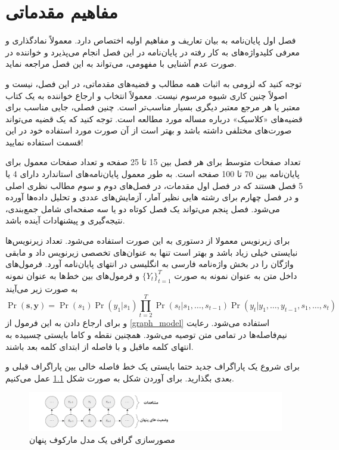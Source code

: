 \chapter{
مفاهیم مقدماتی
}\label{S1}
\setcounter{page}{1}

فصل اول پایان‌نامه به بیان تعاریف و مفاهیم اولیه اختصاص دارد.  معمولاً نمادگذاری و معرفی کلیدواژه‌های به کار رفته در پایان‌نامه در این فصل انجام می‌پذیرد و خواننده در صورت عدم آشنایی با مفهومی، می‌تواند به این فصل مراجعه نماید.

 توجه کنید که لزومی به اثبات همه مطالب و قضیه‌های مقدماتی، در این فصل، نیست و اصولاً چنین کاری شیوه مرسوم نیست. معمولاً انتخاب و ارجاع خواننده به یک کتاب معتبر یا هر مرجع معتبر دیگری بسیار مناسب‌تر است. چنین فصلی، جایی مناسب برای قضیه‌های «کلاسیک» درباره مساله مورد مطالعه است. توجه کنید که یک قضیه می‌تواند صورت‌های مختلفی داشته باشد و بهتر است از آن صورت مورد استفاده خود در این قسمت استفاده نمایید!

تعداد صفحات متوسط برای هر فصل بین 15 تا 25 صفحه و تعداد صفحات معمول برای پایان‌نامه بین 70 تا 100 صفحه است. 
به طور معمول پایان‌نامه‌های استاندارد دارای 4 یا 5 فصل هستند که در فصل اول مقدمات، در فصل‌های دوم و سوم مطالب نظری اصلی و در فصل چهارم برای رشته هایی نظیر آمار، آزمایش‌های عددی و تحلیل داده‌ها آورده می‌شود. فصل پنجم می‌تواند یک فصل کوتاه دو یا سه صفحه‌ای شامل جمع‌بندی، نتیجه‌گیری و پیشنهادات آینده باشد. 

برای زیرنویس معمولا از دستوری به این صورت استفاده می‌شود. تعداد زیرنویس‌ها نبایستی خیلی زیاد باشد و بهتر است تنها به عنوان‌های تخصصی زیرنویس داد و مابقی واژگان را در بخش واژه‌نامه فارسی به انگلیسی  در انتهای پایان‌نامه آورد. فرمول‌های داخل متن به عنوان نمونه به صورت 
 $\{{Y_t}\}_{t=1}^T$
و فرمول‌های بین خط‌ها به عنوان نمونه به صورت زیر می‌آیند
\begin{equation}\label{graph_model}
\Pr(\mathbf{s},\mathbf{y})=\Pr(s_1)\Pr(y_1|s_1)\prod_{t=2}^{T}\Pr(s_t|s_1,\dots,s_{t-1})\Pr(y_t|y_1,\dots,y_{t-1},s_1,\dots,s_{t})
\end{equation}
و برای ارجاع دادن به این فرمول‌ از 
\eqref{graph_model} استفاده می‌شود. رعایت نیم‌فاصله‌ها در تمامی متن توصیه می‌شود. 
همچنین نقطه و کاما بایستی چسبیده به انتهای کلمه ماقبل و با فاصله از ابتدای کلمه بعد باشند. 

برای شروع یک پاراگراف جدید حتما بایستی یک خط فاصله خالی بین پاراگراف قبلی و بعدی بگذارید. برای آوردن شکل به صورت شکل 
\ref{fig.hmm}
عمل می‌کنیم. 
\begin{figure}[h!]
\centering
\includegraphics[scale=0.7]{HMM}
\caption{مصورسازی گرافی یک مدل مارکوف پنهان}
\label{fig.hmm}
\end{figure}

